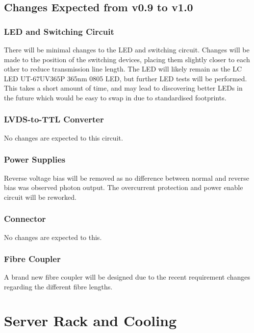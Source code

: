 \documentclass[a4paper,11pt]{article}
\begin{document}
\subsection{Changes Expected from v0.9 to v1.0}\label{ImGoingThroughChanges}

\subsubsection{LED and Switching Circuit}

There will be minimal changes to the LED and switching circuit. Changes will be made to the position of the switching devices, placing them slightly closer to each other to reduce transmission line length. The LED will likely remain as the LC LED UT-67UV365P 365nm 0805 LED, but further LED tests will be performed. This takes a short amount of time, and may lead to discovering better LEDs in the future which would be easy to swap in due to standardised footprints.

\subsubsection{LVDS-to-TTL Converter}

No changes are expected to this circuit.

\subsubsection{Power Supplies}

Reverse voltage bias will be removed as no difference between normal and reverse bias was observed photon output. The overcurrent protection and power enable circuit will be reworked.

\subsubsection{Connector}

No changes are expected to this.

\subsubsection{Fibre Coupler}

A brand new fibre coupler will be designed due to the recent requirement changes regarding the different fibre lengths.


\section{Server Rack and Cooling}
\end{document}
